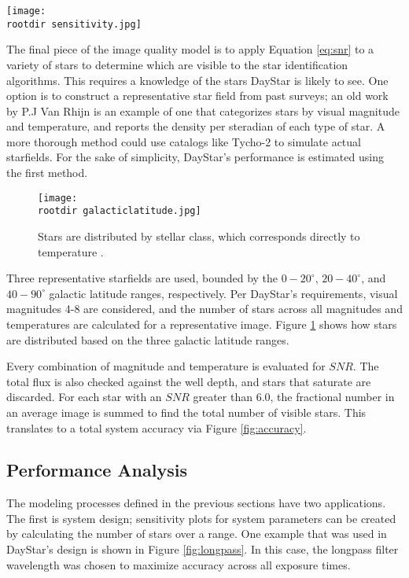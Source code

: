 \documentclass[twocolumn,letterpaper]{IEEEAerospace2012}
\newcommand{\rootdir}{./Figures/}
\newcommand{\SNR}{\mathit{SNR}}
\begin{document}
\begin{figure*}
    \centering
    \texttt{[image: \\rootdir sensitivity.jpg]}
    \caption{The ideal longpass wavelength is between 600nm and 640nm. DayStar uses a 620nm filter.}
    \label{fig:longpass}
\end{figure*}

The final piece of the image quality model is to apply Equation \ref{eq:snr} to a variety of stars to determine which are visible to the star identification algorithms. This requires a knowledge of the stars DayStar is likely to see. One option is to construct a representative star field from past surveys; an old work by P.J Van Rhijn \cite{vanrhijn} is an example of one that categorizes stars by visual magnitude and temperature, and reports the density per steradian of each type of star. A more thorough method could use catalogs like Tycho-2 to simulate actual starfields. For the sake of simplicity, DayStar's performance is estimated using the first method.
\begin{figure}[H]
    \centering
    \texttt{[image: \\rootdir galacticlatitude.jpg]}
    \caption{Stars are distributed by stellar class, which corresponds directly to temperature \protect \cite{stellar}.}
    \label{fig:gl}
\end{figure}
Three representative starfields are used, bounded by the $0-20^\circ$, $20-40^\circ$, and $40-90^\circ$ galactic latitude ranges, respectively. Per DayStar's requirements, visual magnitudes 4-8 are considered, and the number of stars across all magnitudes and temperatures are calculated for a representative image. Figure \ref{fig:gl} shows how stars are distributed based on the three galactic latitude ranges.

Every combination of magnitude and temperature is evaluated for $\SNR$. The total flux is also checked against the well depth, and stars that saturate are discarded. For each star with an $\SNR$ greater than 6.0, the fractional number in an average image is summed to find the total number of visible stars. This translates to a total system accuracy via Figure \ref{fig:accuracy}.

\subsection{Performance Analysis}
The modeling processes defined in the previous sections have two applications. The first is system design; sensitivity plots for system parameters can be created by calculating the number of stars over a range. One example that was used in DayStar's design is shown in Figure \ref{fig:longpass}. In this case, the longpass filter wavelength was chosen to maximize accuracy across all exposure times.
\end{document}

